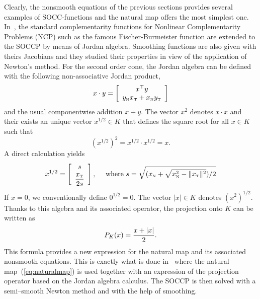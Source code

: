 Clearly, the nonsmooth equations of the previous sections provides several examples of SOCC-functions and the natural map offers the most simplest one. In~\cite{Fukushima.ea2001}, the standard complementarity functions for Nonlinear Complementarity Problems (NCP) such as the famous Fischer-Burmeister function are extended to the SOCCP by means of Jordan algebra. Smoothing functions are also given with theirs Jacobians and they studied their properties in view of the application of Newton's method.  For the second order cone, the Jordan algebra can be defined with the following non-associative Jordan product,
\begin{equation}
  \label{eq:Jordan-product}
  x \cdot y =
  \left[\begin{array}{c}
      x^\top y \\
      y_\n x_\t + x_\n y_\t
  \end{array}
\right]
\end{equation}
and the usual componentwise addition $x+y$. The vector $x^2$ denotes $x\cdot x$ and their exists an unique vector $x^{1/2}\in K$ that defines the square root for all $x \in K$ such that
\begin{equation}
  \label{eq:Jordan-sqrt}
  (x^{1/2})^2 = x^{1/2} \cdot x^{1/2} = x.
\end{equation}
A direct calculation yields
\begin{equation}
  \label{eq:Jordan-sqrt2}
  x^{1/2} =
  \left[\begin{array}{c}
    s \\[1mm]
    \Frac {x_\t} {2s}
  \end{array}\right], \quad \text{ where } s = \sqrt{(x_\n+\sqrt{x_\n^2 - \|x_\t\|^2})/2}
\end{equation}
If $x=0$, we conventionally define $0^{1/2}=0$. The vector $|x| \in K$ denotes $(x^2)^{1/2}$. Thanks to this algebra and its associated operator, the projection onto $K$ can be written as
\begin{equation}
  \label{eq:Jordan-projection}
  P_K(x) = \Frac{x + |x|}2.
\end{equation}
This formula provides a new expression for the natural map and its associated nonsmooth equations. This is exactly what is done in~\cite{Hayashi.ea_SIOPT2005} where the natural map~(\ref{eq:naturalmap}) is used together with an expression of the projection operator based on the Jordan algebra calculus. The SOCCP is then solved with a semi--smooth Newton method and with the help of smoothing.

